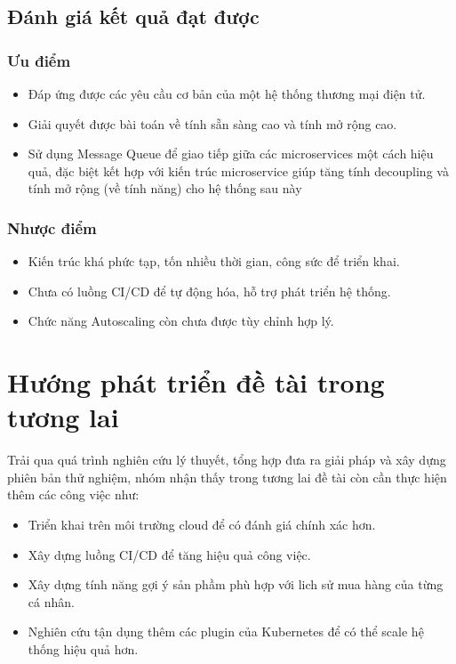 \subsection{Đánh giá kết quả đạt được}
\subsubsection{Ưu điểm}
\begin{itemize}
    \item Đáp ứng được các yêu cầu cơ bản của một hệ thống thương mại điện tử.
    \item Giải quyết được bài toán về tính sẵn sàng cao và tính mở rộng cao.
    \item Sử dụng Message Queue để giao tiếp giữa các microservices một cách hiệu quả, đặc biệt kết hợp với kiến trúc microservice giúp tăng tính decoupling và tính mở rộng (về tính năng) cho hệ thống sau này
\end{itemize}
\subsubsection{Nhược điểm}
\begin{itemize}
    \item Kiến trúc khá phức tạp, tốn nhiều thời gian, công sức để triển khai.
    \item Chưa có luồng CI/CD để tự động hóa, hỗ trợ phát triển hệ thống.
    \item Chức năng Autoscaling còn chưa được tùy chỉnh hợp lý.
\end{itemize}
\section{Hướng phát triển đề tài trong tương lai}
\noindent Trải qua quá trình nghiên cứu lý thuyết, tổng hợp đưa ra giải pháp và xây dựng phiên bản thử nghiệm, nhóm nhận thấy trong tương lai đề tài còn cần thực hiện thêm các công việc như:
\begin{itemize}
    \item Triển khai trên môi trường cloud để có đánh giá chính xác hơn.
    \item Xây dựng luồng CI/CD để tăng hiệu quả công việc.
    \item Xây dựng tính năng gợi ý sản phầm phù hợp với lich sử mua hàng của từng cá nhân.
    \item Nghiên cứu tận dụng thêm các plugin của Kubernetes để có thể scale hệ thống hiệu quả hơn.
\end{itemize}
